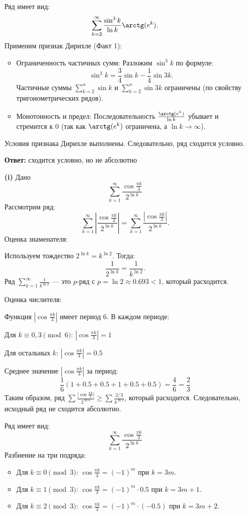 \documentclass[a4paper]{article}
\renewcommand{\geq}{\geqslant}
\begin{document}
\begin{enumerate}
Ряд имеет вид:
\[
\sum_{k=2}^{\infty} \frac{\sin^3 k}{\ln k} \arctg(e^k).
\]
Применим признак Дирихле (Факт 1):
\begin{itemize}
\item Ограниченность частичных сумм: Разложим \( \sin^3 k \) по формуле:
  \[
  \sin^3 k = \frac{3}{4} \sin k - \frac{1}{4} \sin 3k.
  \]
  Частичные суммы \( \sum_{k=2}^n \sin k \) и \( \sum_{k=2}^n \sin 3k \) ограничены (по свойству тригонометрических рядов).
\item Монотонность и предел: Последовательность \( \frac{\arctg(e^k)}{\ln k} \) убывает и стремится к 0 (так как \( \arctg(e^k) \) ограничена, а \( \ln k \to \infty \)).
\end{itemize}

Условия признака Дирихле выполнены. Следовательно, ряд сходится условно.

\textbf{Ответ: } сходится условно, но не абсолютно\\

\item[\textbf{(i)}]Дано
$$\sum_{k=1}^{\infty}  \frac{\cos \frac{\pi k}{3}}{2^{\ln k}}$$
Рассмотрим ряд:
\[
\sum_{k=1}^{\infty} \left| \frac{\cos \frac{\pi k}{3}}{2^{\ln k}} \right| = \sum_{k=1}^{\infty} \frac{|\cos \frac{\pi k}{3}|}{2^{\ln k}}.
\]
Оценка знаменателя:

Используем тождество \( 2^{\ln k} = k^{\ln 2} \). Тогда:
  \[
  \frac{1}{2^{\ln k}} = \frac{1}{k^{\ln 2}}.
  \]
Ряд \( \sum_{k=1}^{\infty} \frac{1}{k^{\ln 2}} \) — это \( p \)-ряд с \( p = \ln 2 \approx 0.693 < 1 \), который расходится.

Оценка числителя:

Функция \( |\cos \frac{\pi k}{3}| \) имеет период 6. В каждом периоде:

Для \( k \equiv 0, 3 \pmod{6} \): \( |\cos \frac{\pi k}{3}| = 1 \)

Для остальных \( k \): \( |\cos \frac{\pi k}{3}| = 0.5 \)

Среднее значение \( |\cos \frac{\pi k}{3}| \) за период:
\[
\frac{1}{6} \left( 1 + 0.5 + 0.5 + 1 + 0.5 + 0.5 \right) = \frac{4}{6} = 
\frac{2}{3}
\]
Таким образом, ряд \( \sum \frac{|\cos \frac{\pi k}{3}|}{2^{\ln k}} \geq 
\sum \frac{2/3}{k^{\ln 2}} \), 
который расходится. Следовательно, исходный ряд не сходится абсолютно.

Ряд имеет вид:
\[
\sum_{k=1}^{\infty} \frac{\cos \frac{\pi k}{3}}{2^{\ln k}}
\]
Разбиение на три подряда:
\begin{itemize}
\item Для \( k \equiv 0 \pmod{3} \): \( \cos \frac{\pi k}{3} =
 (-1)^m \) при \( k = 3m \).
\item Для \( k \equiv 1 \pmod{3} \): \( \cos \frac{\pi k}{3} =
 (-1)^m \cdot 0.5 \) при \( k = 3m + 1 \).
\item Для \( k \equiv 2 \pmod{3} \): \( \cos \frac{\pi k}{3} = 
(-1)^m \cdot (-0.5) \) при \( k = 3m + 2 \).
\end{itemize}


\end{enumerate}
\end{document}
